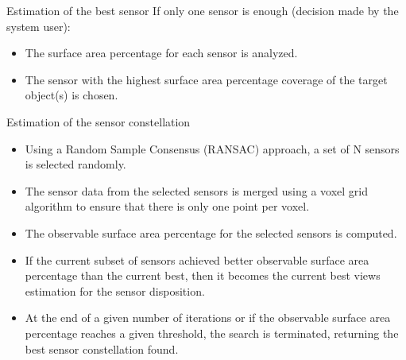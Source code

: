 \begin{frame}{Estimation of the best sensor}
		If only one sensor is enough (decision made by the system user):
		\begin{itemize}
			\item The surface area percentage for each sensor is analyzed.
			\item The sensor with the highest surface area percentage coverage of the target object(s) is chosen.
		\end{itemize}
\end{frame}


\begin{frame}{Estimation of the sensor constellation}
		\begin{itemize}
			\item Using a Random Sample Consensus (RANSAC) approach, a set of N sensors is selected randomly.
			\item The sensor data from the selected sensors is merged using a voxel grid algorithm to ensure that there is only one point per voxel.
			\item The observable surface area percentage for the selected sensors is computed.
			\item If the current subset of sensors achieved better observable surface area percentage than the current best, then it becomes the current best views estimation for the sensor disposition.
			\item At the end of a given number of iterations or if the observable surface area percentage reaches a given threshold, the search is terminated, returning the best sensor constellation found.
		\end{itemize}
\end{frame}


